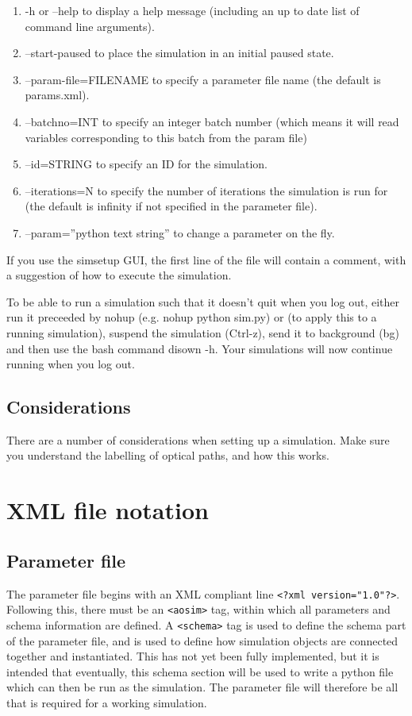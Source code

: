 \documentclass{article}
\begin{document}
\begin{enumerate}
\item -h or --help to display a help message (including an up to date
  list of command line arguments).
\item --start-paused to place the simulation in an initial paused
  state.
\item --param-file=FILENAME to specify a parameter file name (the
  default is params.xml).
\item --batchno=INT to specify an integer batch number (which means it
  will read variables corresponding to this batch from the param file)
\item --id=STRING to specify an ID for the simulation.
\item --iterations=N to specify the number of iterations the simulation
  is run for (the default is infinity if not specified in the
  parameter file).
\item --param=''python text string'' to change a parameter on the fly.
\end{enumerate}
If you use the simsetup GUI, the first line of the file will contain a
comment, with a suggestion of how to execute the simulation.

To be able to run a simulation such that it doesn't quit when you log
out, either run it preceeded by nohup (e.g. nohup python sim.py) or
(to apply this to a running simulation), suspend the simulation
(Ctrl-z), send it to background (bg) and then use the bash command
disown -h.  Your simulations will now continue running when you log out. 

\subsection{Considerations}
There are a number of considerations when setting up a simulation.
Make sure you understand the labelling of optical paths, and how this works.

\section{XML file notation}
\label{sect:paramfile}
\subsection{Parameter file}
The parameter file begins with an XML compliant line \texttt{<?xml
version="1.0"?>}.  Following this, there must be an \texttt{<aosim>}
tag, within which all parameters and schema information are defined.
A \texttt{<schema>} tag is used to define the schema part of the
parameter file, and is used to define how simulation objects are
connected together and instantiated.  This has not yet been fully
implemented, but it is intended that eventually, this schema section
will be used to write a python file which can then be run as the
simulation.  The parameter file will therefore be all that is required
for a working simulation.
\end{document}
